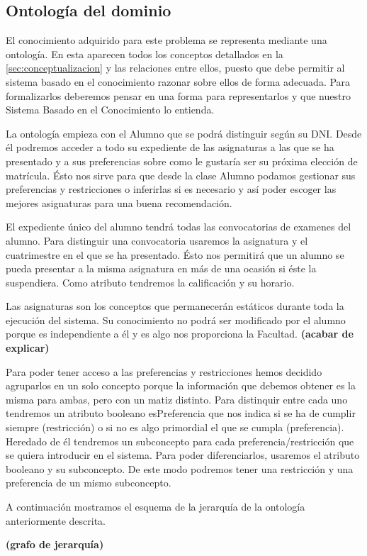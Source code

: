 
\subsection{Ontología del dominio} \label{sec:ontologia}

El conocimiento adquirido para este problema se representa mediante una 
ontología. En esta aparecen todos los conceptos detallados en la 
\autoref{sec:conceptualizacion} y las relaciones entre ellos, puesto que debe 
permitir al sistema basado en el conocimiento razonar sobre ellos de forma 
adecuada. Para formalizarlos deberemos pensar en una forma para representarlos 
y que nuestro Sistema Basado en el Conocimiento lo entienda.

La ontología empieza con el Alumno que se podrá distinguir según su DNI. 
Desde él podremos acceder a todo su expediente de las asignaturas a las 
que se ha presentado y a sus preferencias sobre como le gustaría ser su 
próxima elección de matrícula. Ésto nos sirve para que desde la clase Alumno 
podamos gestionar sus preferencias y restricciones o inferirlas si es 
necesario y así poder escoger las mejores asignaturas para una buena recomendación.

El expediente único del alumno tendrá todas las convocatorias de examenes 
del alumno. Para distinguir una convocatoria usaremos la asignatura y el 
cuatrimestre en el que se ha presentado. Ésto nos permitirá que un alumno 
se pueda presentar a la misma asignatura en más de una ocasión si éste la 
suspendiera. Como atributo tendremos la calificación y su horario.

Las asignaturas son los conceptos que permanecerán estáticos durante toda 
la ejecución del sistema. Su conocimiento no podrá ser modificado por el 
alumno porque es independiente a él y es algo nos proporciona la Facultad. 
\textbf{(acabar de explicar)}

Para poder tener acceso a las preferencias y restricciones hemos decidido 
agruparlos en un solo concepto porque la información que debemos obtener es 
la misma para ambas, pero con un matiz distinto. Para distinquir entre cada 
uno tendremos un atributo booleano esPreferencia que  nos indica si se ha 
de cumplir siempre (restricción) o si no es algo primordial el que se cumpla 
(preferencia). Heredado de él tendremos un subconcepto para cada 
preferencia/restricción que se quiera introducir en el sistema. Para poder 
diferenciarlos, usaremos el atributo booleano y su subconcepto. De este modo 
podremos tener una restricción y una preferencia de un mismo subconcepto.

A continuación mostramos el esquema de la jerarquía de la ontología 
anteriormente descrita.

\textbf{(grafo de jerarquía)}